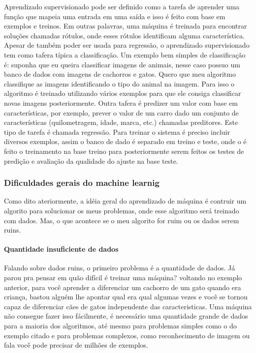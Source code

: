 \documentclass[
  letterpaper,
  DIV=11,
  numbers=noendperiod]{scrreprt}
\let\oldparagraph\paragraph
\renewcommand{\paragraph}[1]{\oldparagraph{#1}\mbox{}}
\begin{document}
Aprendizado supervisionado pode ser definido como a tarefa de aprender
uma função que mapeia uma entrada em uma saída e isso é feito com base
em exemplos e treinos. Em outras palavras, uma máquina é treinada para
encontrar soluções chamadas rótulos, onde esses rótulos identificam
alguma característica. Apesar de também poder ser usada para regressão,
o aprendizado supervisionado tem como tafera típica a classificação. Um
exemplo bem simples de classificação é: suponha que eu queira
classificar imagens de animais, nesse caso possuo um banco de dados com
imagens de cachorros e gatos. Quero que meu algoritmo classifique as
imagens identificando o tipo do animal na imagem. Para isso o algoritmo
é treinado utilizando vários exemplos para que ele consiga classificar
novas imagens posteriormente. Outra tafera é predizer um valor com base
em características, por exemplo, prever o valor de um carro dado um
conjunto de características (quilometragem, idade, marca, etc.) chamadas
preditores. Este tipo de tarefa é chamada regressão. Para treinar o
sistema é preciso incluir diversos exemplos, assim o banco de dado é
separado em treino e teste, onde o é feito o treinamento na base treino
para posteriormente serem feitos os testes de predição e avaliação da
qualidade do ajuste na base teste.

\hypertarget{dificuldades-gerais-do-machine-learnig}{%
\subsubsection{Dificuldades gerais do machine
learnig}\label{dificuldades-gerais-do-machine-learnig}}

Como dito ateriormente, a idéia geral do aprendizado de máquina é
contruir um algorito para solucionar os meus problemas, onde esse
algoritmo será treinado com dados. Mas, o que acontece se o meu algorito
for ruim ou os dados serem ruins.

\hypertarget{quantidade-insuficiente-de-dados}{%
\paragraph{Quantidade insuficiente de
dados}\label{quantidade-insuficiente-de-dados}}

Falando sobre dados ruins, o primeiro problema é a quantidade de dados.
Já parou pra pensar em quão difícil é treinar uma máquina? voltando no
exemplo anterior, para você aprender a diferenciar um cachorro de um
gato quando era criança, bastou alguém lhe apontar qual era qual algumas
vezes e você se tornou capaz de diferenciar cães de gatos independente
das caracteristicas. Uma máquina não consegue fazer isso fácilmente, é
necessário uma quantidade grande de dados para a maioria dos algoritmos,
até mesmo para problemas simples como o do exemplo citado e para
problemas complexos, como reconhecimento de imagem ou fala você pode
precisar de milhões de exemplos.
\end{document}
